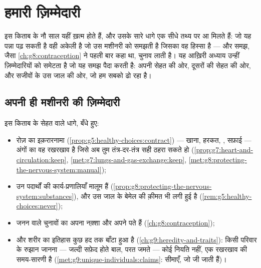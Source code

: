 \chapter{हमारी ज़िम्मेदारी}\label{ch:g9:our-responsibility}

इस किताब के नौ साल यहीं ख़त्म होते हैं, और उसके सारे धागे एक सीधे तथ्य पर
आ मिलते हैं: जो  यह पन्ना पढ़ सकती है वही अकेली  है जो उस
मशीनरी को समझती है जिसका वह हिस्सा है --- और समझ, जैसा
\cref{ch:g8:contraception} ने पहली बार कहा था, चुनाव लाती है। यह आख़िरी
अध्याय उन्हीं ज़िम्मेदारियों को समेटता है जो यह समझ पैदा करती है: अपनी
सेहत की ओर, दूसरों की सेहत की ओर, और सजीवों के उस जाल की ओर, जो हम सबको
ढो रहा है।

\section{अपनी ही मशीनरी की ज़िम्मेदारी}

\begin{proposition}[सेहत, यानी जानकारी वाली अपनी सँभाल]\label{prop:g9:our-responsibility:self}
इस किताब के सेहत वाले धागे, बँधे हुए:
\begin{itemize}
  \item रोज़ का इक़रारनामा
        (\cref{prop:g5:healthy-choices:contract}) --- खाना, हरकत,
        , सफ़ाई --- अंगों का वह रखरखाव है जिसे अब तुम तंत्र-दर-तंत्र
        सही ठहरा सकते हो
        (\cref{prop:g7:heart-and-circulation:keep},
        \cref{met:g7:lungs-and-gas-exchange:keep},
        \cref{met:g8:protecting-the-nervous-system:manual});
  \item उन पदार्थों की कार्य-प्रणालियाँ मालूम हैं
        (\cref{prop:g8:protecting-the-nervous-system:substances}), और
        उस जाल के बेमेल की क़ीमत भी लगी हुई है
        (\cref{rem:g5:healthy-choices:never});
  \item जनन वाले चुनावों का अपना नक़्शा और अपने पते हैं
        (\cref{ch:g8:contraception});
  \item और शरीर का इतिहास कुछ हद तक बाँटा हुआ है
        (\cref{ch:g9:heredity-and-traits}): किसी परिवार के रुझान जानना
        --- जल्दी सफ़ेद होते बाल, परत जमते  --- कोई नियति नहीं, एक
        रखरखाव की समय-सारणी है
        (\cref{met:g9:unique-individuals:claims}: सीमाएँ, जो जी जाती
        हैं)।
\end{itemize}
\end{proposition}
\admitted

